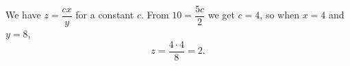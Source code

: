 We have $z=\dfrac{cx}{y}$ for a constant $c$. From $10=\dfrac{5c}{2}$ we get $c=4$, so when $x=4$ and $y=8$,
\[
z=\dfrac{4\cdot4}{8}=\boxed{2}.
\]
